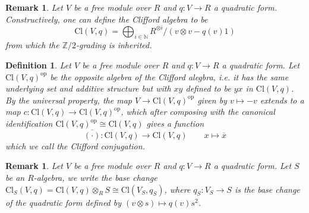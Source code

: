 \documentclass[10pt]{book}
\theoremstyle{bookplain}
\theoremstyle{bookdefinition}
\newtheorem{definition}[theorem]{Definition}
\theoremstyle{bookremark}
\newtheorem{remark}[theorem]{Remark}
\begin{document}
\begin{remark}
    Let $V$ be a free module over $R$ and $q:V\rightarrow R$ a quadratic form. Constructively, one can define the Clifford algebra to be
    \[\mathrm{Cl}(V,q)=\bigoplus_{i\in\mathbb N}R^{\otimes i}\big/(v\otimes v-q(v)1)\]
    from which the $\mathbb Z/2$-grading is inherited. 
\end{remark}
\begin{definition}Let $V$ be a free module over $R$ and $q:V\rightarrow R$ a quadratic form. 
    Let $\mathrm{Cl}(V,q)^{\mathrm{op}}$ be the opposite algebra of the Clifford alegbra, i.e. it has the same underlying set and additive structure but with $xy$ defined to be $yx$ in $\mathrm{Cl}(V,q)$. By the universal property, the map $V\rightarrow\mathrm{Cl}(V,q)^{\mathrm{op}}$ given by $v\mapsto -v$ extends to a map $c:\mathrm{Cl}(V,q)\rightarrow \mathrm{Cl}(V,q)^{\mathrm{op}}$, which after composing with the canonical identification $\mathrm{Cl}(V,q)^{\mathrm{op}}\cong \mathrm{Cl}(V,q)$ gives a function 
    \[\overline{(\cdot)}:\mathrm{Cl}(V,q)\rightarrow \mathrm{Cl}(V,q)\qquad x\mapsto \overline{x}\]
    which we call the \textit{Clifford conjugation}. 
\end{definition}
\begin{remark}Let $V$ be a free module over $R$ and $q:V\rightarrow R$ a quadratic form. Let $S$ be an $R$-algebra, we write the base change $\mathrm{Cl}_S(V,q)=\mathrm{Cl}(V,q)\otimes_R S\cong \mathrm{Cl}(V_S,q_S)$, where $q_S:V_S\rightarrow S$ is the base change of the quadratic form defined by $(v\otimes s)\mapsto q(v)s^2$. 
\end{remark}
\end{document}

